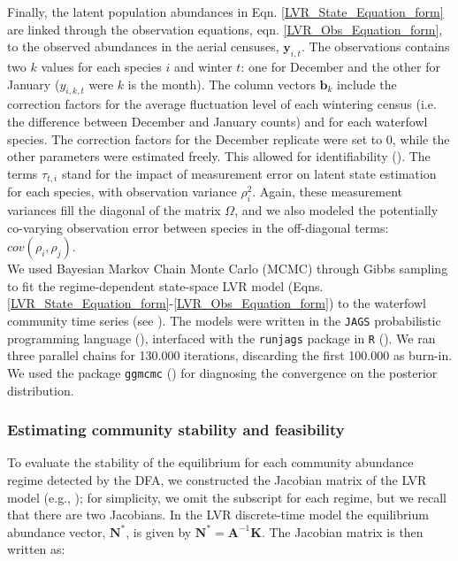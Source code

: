 \documentclass[12pt]{article}
\begin{document}
Finally, the latent population abundances in Eqn. \ref{LVR_State_Equation_form} are linked through the observation equations, eqn. \ref{LVR_Obs_Equation_form}, to the observed abundances in the aerial censuses, $\textbf{y}_{i,t}$. The observations contains two $k$ values for each species $i$ and winter $t$: one for December and the other for January ($ y_{i,k,t}$ were $k$ is the month). The column vectors $ \mathbf{b}_{k} $ include the correction factors for the average fluctuation level of each wintering census (i.e. the difference between December and January counts) and for each waterfowl species. The correction factors for the December replicate were set to 0, while the other parameters were estimated freely. This allowed for identifiability (\cite{Mutshinda2011,Almaraz2012}). The terms $\tau_{t,i}$ stand for the impact of measurement error on latent state estimation for each species, with observation variance $\rho^2_{i}$. Again, these measurement variances fill the diagonal of the matrix $ \Omega $, and we also modeled the potentially co-varying observation error between species in the off-diagonal terms: $ cov(\rho_{i},\rho_{j}) $. \\

We used Bayesian Markov Chain Monte Carlo (MCMC) through Gibbs sampling to fit the regime-dependent state-space LVR model (Eqns. \ref{LVR_State_Equation_form}-\ref{LVR_Obs_Equation_form}) to the waterfowl community time series (see \cite{Almaraz2012,Mutshinda2011}). The models were written in the \verb|JAGS| probabilistic programming language (\cite{Plummer2003}), interfaced with the \verb|runjags| package in \verb|R| (\cite{Denwood2016}). We ran three parallel chains for 130.000 iterations, discarding the first 100.000 as burn-in. We used the package \verb|ggmcmc| (\cite{Fernandez-Marin2016}) for diagnosing the convergence on the posterior distribution. \\

\subsubsection*{Estimating community stability and feasibility}
\label{subsubsec:Estimating community stability and feasibility}

To evaluate the stability of the equilibrium for each community abundance regime detected by the DFA, we constructed the Jacobian matrix of the LVR model (e.g., \cite{Ranta2006}); for simplicity, we omit the subscript for each regime, but we recall that there are two Jacobians. In the LVR discrete-time model the equilibrium abundance vector, $ \mathbf{N}^* $, is given by $ \mathbf{N}^* = \mathbf{A}^{-1} \mathbf{K} $. The Jacobian matrix is then written as:
\end{document}
